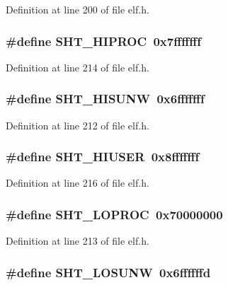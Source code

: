 Definition at line 200 of file elf.h.
\subsubsection[{SHT\_\-HIPROC}]{\setlength{\rightskip}{0pt plus 5cm}\#define SHT\_\-HIPROC~0x7fffffff}\label{elf_8h_9be8a10dd9e8859bec0b640038890d51}




Definition at line 214 of file elf.h.
\subsubsection[{SHT\_\-HISUNW}]{\setlength{\rightskip}{0pt plus 5cm}\#define SHT\_\-HISUNW~0x6fffffff}\label{elf_8h_e9be883658cc4a7d6f522dda8b936278}




Definition at line 212 of file elf.h.
\subsubsection[{SHT\_\-HIUSER}]{\setlength{\rightskip}{0pt plus 5cm}\#define SHT\_\-HIUSER~0x8fffffff}\label{elf_8h_e46f05b4c63b841f74e2d349d777a688}




Definition at line 216 of file elf.h.
\subsubsection[{SHT\_\-LOPROC}]{\setlength{\rightskip}{0pt plus 5cm}\#define SHT\_\-LOPROC~0x70000000}\label{elf_8h_5180feedae655c854f46e4f7f8b0d75a}




Definition at line 213 of file elf.h.
\subsubsection[{SHT\_\-LOSUNW}]{\setlength{\rightskip}{0pt plus 5cm}\#define SHT\_\-LOSUNW~0x6ffffffd}\label{elf_8h_26cef31b1c7dd99ec65f14a280f681e0}




